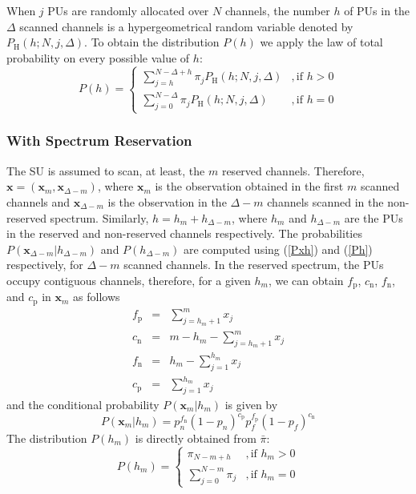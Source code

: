 When $j$ PUs are randomly allocated over $N$ channels, the number $h$ of PUs in the $\Delta$ scanned channels is a hypergeometrical random variable denoted by $P_{\text{H}}\left(h;N,j,\Delta\right)$. 
To obtain the distribution $P(h)$ we apply the law of total probability on every possible value of $h$:
\begin{equation}\label{Ph}
P\left(h\right) =
\begin{cases}
\sum_{j=h}^{N-\Delta+h}\pi_{j}P_{\text{H}}\left(h;N,j,\Delta\right)&,\mbox{if }h>0\\
\sum_{j=0}^{N-\Delta}\pi_{j}P_{\text{H}}\left(h;N,j,\Delta\right)&,\mbox{if }h=0
\end{cases}
\end{equation}

\subsubsection{With Spectrum Reservation}
The SU is assumed to scan, at least, the $m$ reserved channels. Therefore, $\mathbf{x}=\left(\mathbf{x}_{m}, \mathbf{x}_{\Delta-m}\right)$, where $\mathbf{x}_{m}$ is the observation obtained in the first $m$ scanned channels and $\mathbf{x}_{\Delta-m}$ is the observation in the $\Delta-m$ channels scanned in the non-reserved spectrum. Similarly, $h=h_{m}+h_{\Delta-m}$, where $h_{m}$ and $h_{\Delta-m}$ are the PUs in the reserved and non-reserved channels respectively. The probabilities $P\left(\mathbf{x}_{\Delta-m}|h_{\Delta-m}\right)$ and $P\left(h_{\Delta-m}\right)$ are computed using (\ref{Pxh}) and (\ref{Ph}) respectively, for $\Delta-m$ scanned channels. In the reserved spectrum, the PUs occupy contiguous channels, therefore, for a given $h_{m}$, we can obtain $f_{\text{p}}$, $c_{\text{n}}$, $f_{\text{n}}$, and $c_{\text{p}}$ in $\mathbf{x}_{m}$ as follows
\begin{equation}
\begin{array}{lcl}
f_{\text{p}} & = & \sum_{j=h_{m}+1}^{m}x_{j}\\
c_{\text{n}} & = & m-h_{m}-\sum_{j=h_{m}+1}^{m}x_{j}\\
f_{\text{n}} & = & h_{m}-\sum_{j=1}^{h_{m}}x_{j}\\
c_{\text{p}} & = & \sum_{j=1}^{h_{m}}x_{j}
\end{array}
\end{equation}
and the conditional probability $P\left(\mathbf{x}_{m}|h_{m}\right)$ is given by
\begin{equation}
P\left(\mathbf{x}_{m}|h_{m}\right) = p_{n}^{f_{\text{n}}}\left(1-p_{n}\right)^{c_{\text{p}}}p_{f}^{f_{\text{p}}}\left(1-p_{f}\right)^{c_{\text{n}}}
\end{equation}
The distribution $P(h_{m})$ is directly obtained from $\bar{\pi}$:
\begin{equation}
P\left(h_{m}\right) =
\begin{cases}
\pi_{N-m+h}&,\mbox{if }h_{m}>0\\
\sum_{j=0}^{N-m}\pi_{j}&,\mbox{if }h_{m}=0
\end{cases}
\end{equation}
